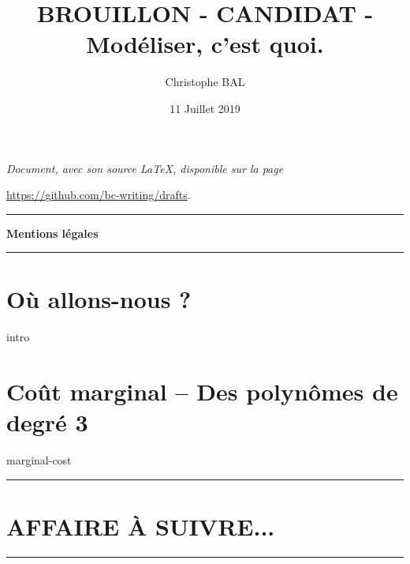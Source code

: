 \documentclass[12pt]{amsart}
\begin{document}
\title{BROUILLON - CANDIDAT - Modéliser, c'est quoi.}
\author{Christophe BAL}
\date{11 Juillet 2019}

\maketitle

\begin{center}
	\itshape
	Document, avec son source \LaTeX, disponible sur la page
	
	\url{https://github.com/bc-writing/drafts}.
\end{center}


\bigskip


\begin{center}
	\hrule\vspace{.3em}
	{
		\fontsize{1.35em}{1em}\selectfont
		\textbf{Mentions \og légales \fg}
	}
			
	\vspace{0.45em}
	\doclicenseThis
	\hrule
\end{center}



\setcounter{tocdepth}{2}
\tableofcontents



\section{Où allons-nous ?}

{intro}



\section{Coût marginal -- Des polynômes de degré 3}

{marginal-cost}



%
%
%
%
%
%
%
%
%



\bigskip

\hrule

\section{AFFAIRE À SUIVRE...}

\bigskip

\hrule
\end{document}
